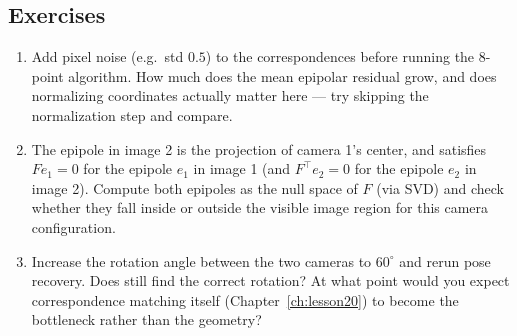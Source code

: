 \subsection*{Exercises}
\begin{enumerate}
  \item Add pixel noise (e.g.\ std $0.5$) to the correspondences before running the 8-point algorithm. How much does the mean epipolar residual grow, and does normalizing coordinates actually matter here --- try skipping the normalization step and compare.
  \item The epipole in image 2 is the projection of camera 1's center, and satisfies $Fe_1=0$ for the epipole $e_1$ in image 1 (and $F^\top e_2=0$ for the epipole $e_2$ in image 2). Compute both epipoles as the null space of $F$ (via SVD) and check whether they fall inside or outside the visible image region for this camera configuration.
  \item Increase the rotation angle between the two cameras to $60^\circ$ and rerun pose recovery. Does  still find the correct rotation? At what point would you expect correspondence matching itself (Chapter~\ref{ch:lesson20}) to become the bottleneck rather than the geometry?
\end{enumerate}

\vfill
{}

